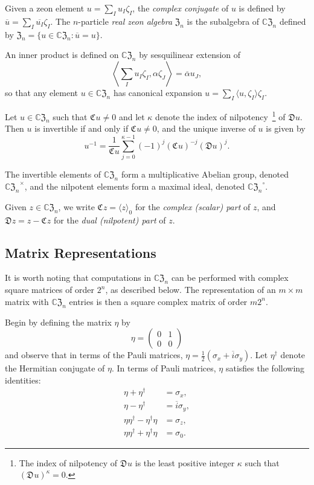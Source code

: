\documentclass{article}
\theoremstyle{definition}
\newcommand{\zco}{\mathfrak{C}\mspace{1mu}}
\newcommand{\zdu}{\mathfrak{D}\mspace{1mu}}
\newcommand{\CZ}{\mathbb{C}\mathfrak{Z}}
\newcommand{\Z}{\mathfrak{Z}}
\numberwithin{equation}{section}
\begin{document}
Given a zeon element $u=\sum_I u_I\zeta_I$, the {\em complex conjugate} of $u$ is defined by $\overline{u}=\sum_I \overline{u_I}\zeta_I$.
The $n$-particle {\em real zeon algebra} $\Z_n$ is the subalgebra of $\CZ_n$ defined by $\Z_n=\{u\in\CZ_n: \overline{u}=u\}.$

An inner product is defined on $\CZ_n$ by sesquilinear extension of \begin{equation*}
\left< \sum_I u_I \zeta_I, \alpha\zeta_J\right> = \overline\alpha u_J,
\end{equation*}
so that any element $u\in\CZ_n$ has canonical expansion $u=\sum_I \langle u,\zeta_I\rangle\zeta_I.$

Let $u\in\CZ_n$ such that $\zco u\ne 0$ and let $\kappa$ denote the index of nilpotency~\footnote{The index of nilpotency of $\zdu u$ is the least positive integer $\kappa$ such that  $(\zdu u)^\kappa=0$.} of $\mathfrak{D}u$.  Then $u$ is invertible if and only if $\zco u\ne0$, and the unique inverse of $u$ is given by \begin{equation*}
u^{-1}=\frac{1}{\zco u}\sum_{j=0}^{\kappa-1}(-1)^{j}(\zco u)^{-j}(\mathfrak{D}u)^{j}.
\end{equation*}

The invertible elements of $\CZ_n$ form a multiplicative Abelian group, denoted ${\CZ_n}^\times$, and the nilpotent elements form a maximal ideal, denoted ${\CZ_n}^\circ$.

Given $z\in\CZ_n$, we write $\zco z=\langle z\rangle_0$ for the {\em complex (scalar) part} of $z$, and $\mathfrak{D}z=z-\zco z$ for the {\em dual (nilpotent) part} of $z$.



\subsection{Matrix Representations}\label{zeons from Pauli matrices}

It is worth noting that computations in $\CZ_n$ can be performed with complex square matrices of order $2^n$, as described below.  The representation of an $m\times m$ matrix with $\CZ_n$ entries is then a square complex matrix of order $m2^n$.  

Begin by defining the matrix $\eta$ by 
\begin{equation}\label{eta def}
\eta=\begin{pmatrix}
0&1\\
0&0
\end{pmatrix}
\end{equation}
and observe that in terms of the Pauli matrices, $\eta=\frac{1}{2}(\sigma_x+\overline{i}\sigma_y)$. Let $\eta^\dag$ denote the Hermitian conjugate of $\eta$.  In terms of Pauli matrices, $\eta$ satisfies the following identities:
\begin{align*}
\eta+\eta^\dag &=\sigma_x,\\
\eta-\eta^\dag &=\overline{i}\sigma_y,\\
\eta\eta^\dag -\eta^\dag\eta&=\sigma_z,\\
\eta\eta^\dag+\eta^\dag\eta &=\sigma_0.
\end{align*}
\end{document}
